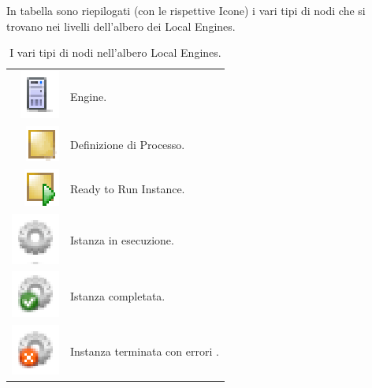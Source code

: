 In tabella sono riepilogati (con le rispettive Icone) i vari tipi di nodi che
si trovano nei livelli dell'albero dei Local Engines.

\begin{table}[hb!]
\begin{center}
\begin{tabular}{rp{}}
\includegraphics[scale=0.70]{blide/dia/server} & Engine.\\ 
\includegraphics[scale=0.70]{blide/dia/defnode} & Definizione di Processo.\\
\includegraphics[scale=0.70]{blide/dia/defnodeRun} & Ready to Run Instance.\\
\includegraphics[scale=0.70]{blide/dia/instdef} & Istanza in esecuzione.\\
\includegraphics[scale=0.70]{blide/dia/instdefok} & Istanza completata.\\
\includegraphics[scale=0.70]{blide/dia/instdefko} & Instanza terminata con
errori .\\
\end{tabular}
\caption[I vari tipi di nodi nell'albero Local Engines]{I vari tipi di nodi
nell'albero Local Engines.}
\label{tab:bicons}
\end{center}
\end{table}

